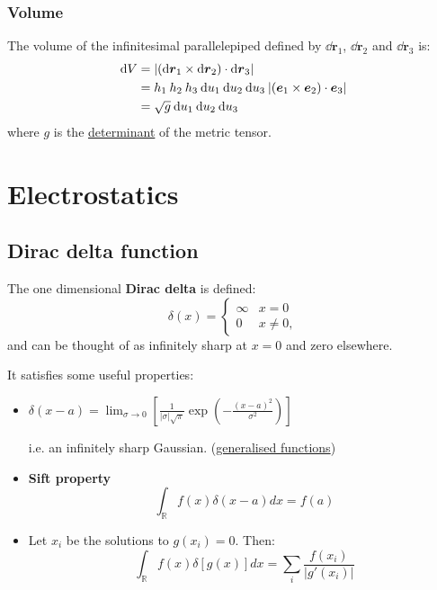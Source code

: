 \documentclass{article}
\begin{document}
\subsubsection{Volume}
The volume of the infinitesimal parallelepiped defined by
$\dd\boldsymbol{r}_1$, $\dd\boldsymbol{r}_2$ and $\dd\boldsymbol{r}_3$ is:
\begin{align*}
    \dd V
    &=|(\dd\boldsymbol{r}_1\times\dd\boldsymbol{r}_2)
    \cdot\dd\boldsymbol{r}_3| \\
    &=h_1\hspace{0.03in}h_2\hspace{0.03in}h_3\hspace{0.03in}
    \dd u_1\hspace{0.03in}\dd u_2\hspace{0.03in}\dd u_3\hspace{0.03in}
    |(\boldsymbol{e}_1\times\boldsymbol{e}_2)
    \cdot\boldsymbol{e}_3| \\
    &=\sqrt{g}\hspace{0.03in}
    \dd u_1\hspace{0.03in}\dd u_2\hspace{0.03in}\dd u_3\hspace{0.03in}
\end{align*}
where $g$ is the \underline{determinant} of the metric tensor.
\newpage

\section{Electrostatics}

\subsection{Dirac delta function}
The one dimensional \textbf{Dirac delta} is defined:
$$\delta(x) =
    \left\{
	\begin{array}{ll}
		\infty  & \mbox{} x=0 \\
		0 & \mbox{} x\neq0,
	\end{array}
    \right.$$
and can be thought of as infinitely sharp at $x=0$ and zero elsewhere. 

It satisfies some useful properties:
\begin{itemize}
    \item $\delta(x-a) =
    \displaystyle\lim_{\sigma\rightarrow0}\left[\frac{1}{|\sigma|\sqrt{\pi}}
    \exp\left(-\frac{(x-a)^2}{\sigma^2}\right)\right]$

    i.e. an infinitely sharp Gaussian. (\underline{generalised functions})

    \item \textbf{Sift property}
    $$\int_{\mathbb{R}}f(x)\delta(x-a)dx=f(a)$$

    \item Let $x_i$ be the solutions to $g(x_i)=0$. Then:
    $$\int_{\mathbb{R}}f(x)\delta[g(x)]dx
    =\sum_i\frac{f(x_i)}{|g'(x_i)|}$$
\end{itemize}
\end{document}
